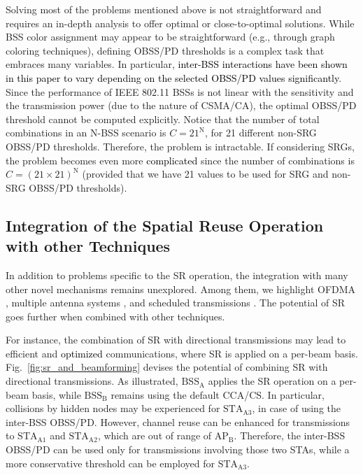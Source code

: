 \documentclass{ieeeaccess}
\begin{document}
Solving most of the problems mentioned above is not straightforward and requires an in-depth analysis to offer optimal or close-to-optimal solutions. While BSS color assignment may appear to be straightforward (e.g., through graph coloring techniques), defining OBSS/PD thresholds is a complex task that embraces many variables. In particular, \textcolor{black}{inter-BSS interactions have been shown in this paper to vary depending on the selected OBSS/PD values significantly}. Since the performance of IEEE 802.11 BSSs is not linear with the sensitivity and the transmission power (due to the nature of CSMA/CA), the optimal OBSS/PD threshold cannot be computed explicitly. Notice that the number of total combinations in an N-BSS scenario is $C = 21^\text{N}$, for 21 different non-SRG OBSS/PD thresholds. Therefore, the problem is intractable. If considering SRGs, the problem becomes even more \textcolor{black}{complicated} since the number of combinations is $C = (21\times21)^\text{N}$ (provided that we have 21 values to be used for SRG and non-SRG OBSS/PD thresholds).

\subsection{Integration of the Spatial Reuse Operation with other Techniques}

In addition to problems specific to the SR operation, the integration with many other novel mechanisms remains unexplored. Among them, we highlight OFDMA \cite{bankov2018ofdma, dovelos2018optimal}, multiple antenna systems \cite{liao2016mu}, and scheduled transmissions \cite{nurchis2019target}. The potential of SR goes further when combined with other techniques. 

For instance, the combination of SR with directional transmissions may lead to efficient and \textcolor{black}{optimized} communications, where SR is applied on a per-beam basis. Fig.~\ref{fig:sr_and_beamforming} devises the potential of combining SR with directional transmissions. As illustrated, $\text{BSS}_\text{A}$ applies the SR operation on a per-beam basis, while $\text{BSS}_\text{B}$ remains using the default CCA/CS. In particular, collisions by hidden nodes may be experienced for $\text{STA}_\text{A3}$, in case of using the inter-BSS OBSS/PD. However, channel reuse can be enhanced for transmissions to $\text{STA}_\text{A1}$ and $\text{STA}_\text{A2}$, which are out of range of $\text{AP}_\text{B}$. Therefore, the inter-BSS OBSS/PD can be used only for transmissions involving those two STAs, while a more conservative threshold can be employed for $\text{STA}_\text{A3}$.
\end{document}
